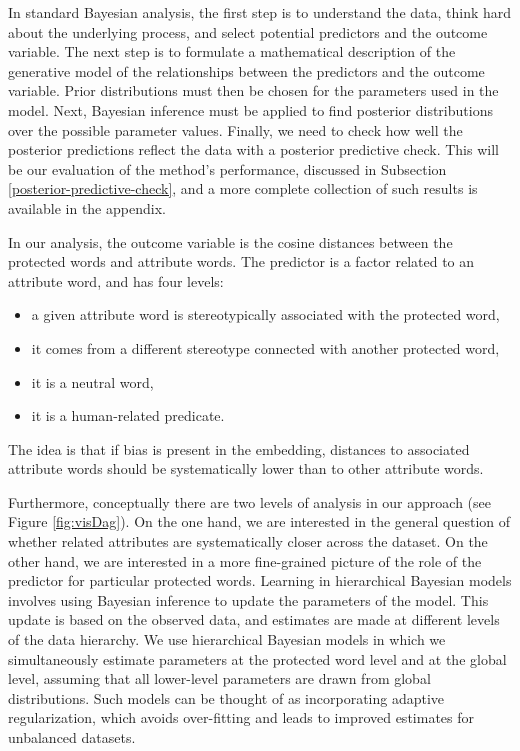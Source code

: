 \documentclass{clv3}
\begin{document}
In standard Bayesian analysis, the first step is to understand the
data, think hard about the underlying process, and select potential
predictors and the outcome variable. The next step is to formulate a
mathematical description of the generative model of the relationships
between the predictors and the outcome variable. Prior distributions
must then be chosen for the parameters used in the model. Next, Bayesian
inference must be applied to find posterior distributions over the
possible parameter values. Finally, we need to check how well the
posterior predictions reflect the data with a posterior predictive
check. This will be our evaluation of the method's performance, discussed in Subsection \ref{posterior-predictive-check}, and a more complete collection of such results is available in the appendix.

In our analysis, the outcome variable is the cosine distances between the
protected words and attribute words. The predictor is a factor related to an attribute word, and has  four levels:
\begin{itemize}[noitemsep]
	\item a given attribute word is stereotypically associated with the protected word,
	\item it comes from a different stereotype connected with another protected word,
	
	\item it is a neutral word,
	
	\item it is a human-related predicate.
	
\end{itemize} 
\noindent The idea is that if bias is present in the embedding,
distances to associated attribute words should be systematically lower
than to other attribute words.



Furthermore, conceptually there are two levels of analysis in our
approach (see Figure \ref{fig:visDag}). On the one hand, we are
interested in the general question of whether related attributes are
systematically closer across the dataset. On the other hand, we are
interested in a more fine-grained picture of the role of the predictor
for particular protected words. Learning in hierarchical Bayesian models
involves using Bayesian inference to update the parameters of the model.
This update is based on the observed data, and estimates are made at
different levels of the data hierarchy. We use hierarchical Bayesian
models in which we simultaneously estimate parameters at the protected
word level and at the global level, assuming that all lower-level
parameters are drawn from global distributions. Such models can be
thought of as incorporating adaptive regularization, which avoids
over-fitting and leads to improved estimates for unbalanced datasets.
\end{document}
